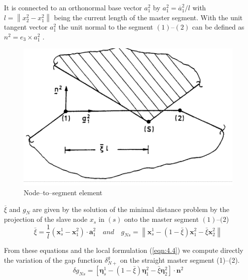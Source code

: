 It is connected to an orthonormal base vector $a ^2_1$  by $a ^2_1 = \overline{a}^2_1 / l $ with $l =\left\| x ^2_2 -  x ^2_1 \right\| $  being
the current length of the master segment. With the unit tangent vector $a ^2_1$ the unit normal
to the segment $(1)–(2)$ can be deﬁned as $n ^2 = e _3 × a ^2_1$ .
\begin{figure}[H]
    \centering
    \includegraphics[scale=0.6]{Figure2/Chap4/fig6.png}
    \caption{Node–to–segment element}
    \label{fig4:6}
\end{figure}

$\overline{\xi}$ and $g _N$ are given by the solution of the minimal distance problem by the projection
of the slave node $x_s$ in $(s)$ onto the master segment $(1)–(2$)
\begin{equation}
    \label{eqn:4.51}
     \bar{\xi}=\frac{1}{l}\left(\mathbf{x}_{s}^{1}-\mathbf{x}_{1}^{2}\right) \cdot \mathbf{a}_{1}^{2} \quad  \textit{and}  \quad g_{N s}=\left\|\mathbf{x}_{s}^{1}-(1-\bar{\xi}) \mathbf{x}_{1}^{2}-\bar{\xi} \mathbf{x}_{2}^{2}\right\| 
\end{equation}

From these equations and the local formulation (\ref{eqn:4.4}) we compute directly the variation of the
gap function $\delta^g_{N+}$ on the straight master segment (1)–(2).
\begin{equation}
 \delta g_{N s}=\left[\boldsymbol{\eta}_{s}^{1}-(1-\bar{\xi}) \boldsymbol{\eta}_{1}^{2}-\bar{\xi} \boldsymbol{\eta}_{2}^{2}\right] \cdot \mathbf{n}^{2}
 \label{eqn:4.52}
\end{equation}

